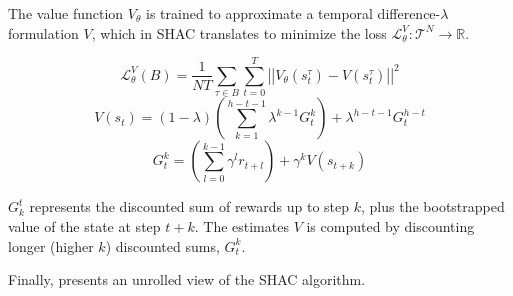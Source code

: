 The value function $V_\theta$ is trained to approximate a temporal difference-$\lambda$ formulation \cite{Sutton98} $V$, which in SHAC translates to minimize the loss $\mathcal{L}_\theta^{V}:\mathcal{T}^N\rightarrow\mathbb{R}$.

$$ \mathcal{L}_\theta^V(B)=\frac{1}{NT}\sum_{\tau\in B}\sum_{t=0}^T\left|\left| V_\theta(s^\tau_t) - V(s^\tau_t) \right|\right|^2 $$
$$ V(s_t) = (1-\lambda) \left(\sum_{k=1}^{h-t-1}\lambda^{k-1}G_t^k\right) + \lambda^{h-t-1}G_t^{h-t}$$
$$ G_t^k = \left(\sum_{l=0}^{k-1}\gamma^l r_{t+l}\right) + \gamma^k V(s_{t+k})$$

$G^t_k$ represents the discounted sum of rewards up to step $k$, plus the bootstrapped value of the state at step $t+k$. The estimates $V$ is computed by discounting longer (higher $k$) discounted sums, $G^k_t$.

Finally,  presents an unrolled view of the SHAC algorithm.
